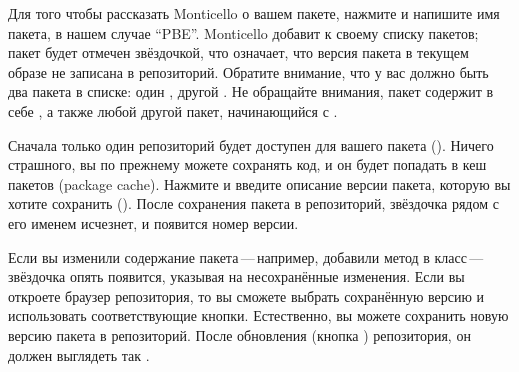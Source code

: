 \documentclass[a4paper,10pt,twoside]{book}
\begin{document}
Для того чтобы рассказать Monticello о вашем пакете, нажмите  и напишите имя пакета, в нашем случае ``PBE''.  Monticello добавит  к своему списку пакетов; пакет будет отмечен звёздочкой, что означает, что версия пакета в текущем образе не записана в репозиторий. Обратите внимание, что у вас  должно быть два пакета в списке: один , другой . Не обращайте внимания, пакет  содержит в себе , а также любой другой пакет, начинающийся с .


Сначала только один репозиторий будет доступен для вашего пакета (). Ничего страшного, вы по прежнему можете сохранять код, и он будет попадать в кеш пакетов (package cache). Нажмите  и введите описание версии пакета, которую вы хотите сохранить (). После сохранения пакета в репозиторий, звёздочка рядом с его именем исчезнет, и появится номер версии.


Если вы изменили содержание пакета\,---\,например, добавили метод в класс\,---\, звёздочка опять появится, указывая на несохранённые изменения. Если вы откроете браузер репозитория, то вы сможете выбрать сохранённую версию и использовать соответствующие кнопки. Естественно, вы можете сохранить новую версию пакета в репозиторий. После обновления (кнопка ) репозитория, он должен выглядеть так .
\end{document}
